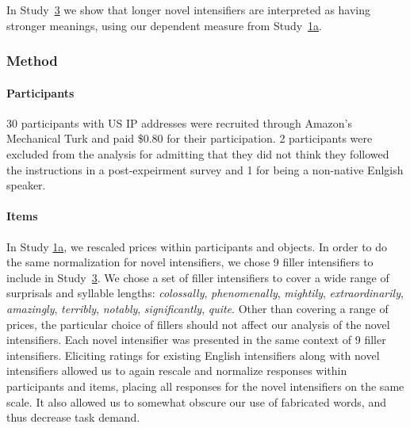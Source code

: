 \documentclass[10pt,letterpaper]{article}
\newcommand{\w}[1]{\emph{#1}}
\begin{document}

In Study~\hyperref[sec:study3]{3} we show that longer novel intensifiers are interpreted as having stronger meanings, using our dependent measure from Study~\hyperref[sec:study1a]{1a}.

\subsubsection{Method}

\paragraph{Participants}

30 participants with US IP addresses were recruited through Amazon's Mechanical Turk and paid \$0.80 for their participation. 2 participants were excluded from the analysis for admitting that they did not think they followed the instructions in a post-expeirment survey and 1 for being a non-native Enlgish speaker.

\paragraph{Items}

In Study \hyperref[sec:study1a]{1a}, we rescaled prices within participants and objects.
In order to do the same normalization for novel intensifiers, we chose 9 filler intensifiers to include in Study~\hyperref[sec:study3]{3}.
We chose a set of filler intensifiers to cover a wide range of surprisals and syllable lengths: \w{colossally}, \w{phenomenally}, \w{mightily}, \w{extraordinarily}, \w{amazingly}, \w{terribly}, \w{notably}, \w{significantly}, \w{quite}.
Other than covering a range of prices, the particular choice of fillers should not affect our analysis of the novel intensifiers.
Each novel intensifier was presented in the same context of 9 filler intensifiers.
Eliciting ratings for existing English intensifiers along with novel intensifiers allowed us to again rescale and normalize responses within participants and items, placing all responses for the novel intensifiers on the same scale.
It also allowed us to somewhat obscure our use of fabricated words, and thus decrease task demand.
\end{document}
